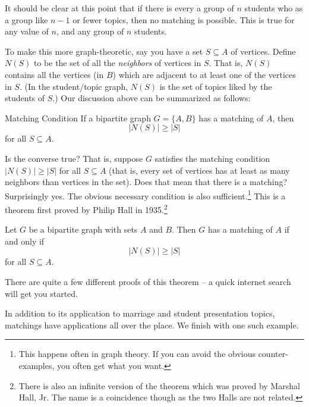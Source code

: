 \documentclass[12pt]{article}
\begin{document}
It should be clear at this point that if there is every a group of $n$ students who as a group like $n-1$ or fewer topics, then no matching is possible.  This is true for any value of $n$, and any group of $n$ students.  

To make this more graph-theoretic, say you have a set $S \subseteq A$ of vertices.  Define $N(S)$ to be the set of all the {\em neighbors} of vertices in $S$.  That is, $N(S)$ contains all the vertices (in $B$) which are adjacent to at least one of the vertices in $S$.  (In the student/topic graph, $N(S)$ is the set of topics liked by the students of $S$.)  Our discussion above can be summarized as follows:

\begin{defbox}{Matching Condition}
If a bipartite graph $G = \{A, B\}$ has a matching of $A$, then 
\[|N(S)| \ge |S|\]
for all $S \subseteq A$.
\end{defbox}

Is the converse true?  That is, suppose $G$ satisfies the matching condition $|N(S)| \ge |S|$ for all $S \subseteq A$ (that is, every set of vertices has at least as many neighbors than vertices in the set).  Does that mean that there is a matching?  Surprisingly yes.  The obvious necessary condition is also sufficient.\footnote{This happens often in graph theory.  If you can avoid the obvious counter-examples, you often get what you want.}  This is a theorem first proved by Philip Hall in 1935.\footnote{There is also an infinite version of the theorem which was proved by Marshal Hall, Jr.  The name is a coincidence though as the two Halls are not related.}

\begin{theorem}
Let $G$ be a bipartite graph with sets $A$ and $B$.  Then $G$ has a matching of $A$ if and only if
\[|N(S)| \ge |S|\]
for all $S \subseteq A$.
\end{theorem}

There are quite a few different proofs of this theorem -- a quick internet search will get you started.  

In addition to its application to marriage and student presentation topics, matchings have applications all over the place.  We finish with one such example.
\end{document}

